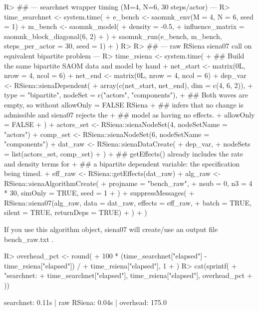 \documentclass[
  article]{jss}
\begin{document}
\begin{CodeChunk}
\begin{CodeInput}
R> ## --- searchnet wrapper timing (M=4, N=6, 30 steps/actor) ---
R> time_searchnet <- system.time({
+   e_bench <- saomnk_env(M = 4, N = 6, seed = 1)
+   m_bench <- saomnk_model(
+     density = -0.5,
+     influence_matrix = saomnk_block_diagonal(6, 2)
+   )
+   saomnk_run(e_bench, m_bench, steps_per_actor = 30, seed = 1)
+ })
R> 
R> ## --- raw RSiena siena07 call on equivalent bipartite problem ---
R> time_rsiena <- system.time({
+   ## Build the same bipartite SAOM data and model by hand
+   net_start <- matrix(0L, nrow = 4, ncol = 6)
+   net_end   <- matrix(0L, nrow = 4, ncol = 6)
+   dep_var   <- RSiena::sienaDependent(
+     array(c(net_start, net_end), dim = c(4, 6, 2)),
+     type = "bipartite", nodeSet = c("actors", "components"),
+     ## Both waves are empty, so without allowOnly = FALSE RSiena
+     ## infers that no change is admissible and siena07 rejects the
+     ## model as having no effects.
+     allowOnly = FALSE
+   )
+   actors_set <- RSiena::sienaNodeSet(4, nodeSetName = "actors")
+   comp_set   <- RSiena::sienaNodeSet(6, nodeSetName = "components")
+   dat_raw    <- RSiena::sienaDataCreate(
+     dep_var,
+     nodeSets = list(actors_set, comp_set)
+   )
+   ## getEffects() already includes the rate and density terms for
+   ## a bipartite dependent variable: the specification being timed.
+   eff_raw <- RSiena::getEffects(dat_raw)
+   alg_raw <- RSiena::sienaAlgorithmCreate(
+     projname = "bench_raw",
+     nsub = 0, n3 = 4 * 30, simOnly = TRUE, seed = 1
+   )
+   suppressMessages(
+     RSiena::siena07(alg_raw, data = dat_raw, effects = eff_raw,
+                     batch = TRUE, silent = TRUE, returnDeps = TRUE)
+   )
+ })
\end{CodeInput}
\begin{CodeOutput}
If you use this algorithm object, siena07 will create/use an output file bench_raw.txt .
\end{CodeOutput}
\begin{CodeInput}
R> overhead_pct <- round(
+   100 * (time_searchnet["elapsed"] - time_rsiena["elapsed"]) /
+     time_rsiena["elapsed"], 1
+ )
R> cat(sprintf(
+   "searchnet: %
+   time_searchnet["elapsed"], time_rsiena["elapsed"], overhead_pct
+ ))
\end{CodeInput}
\begin{CodeOutput}
searchnet: 0.11s | raw RSiena: 0.04s | overhead: 175.0%
\end{CodeOutput}
\end{CodeChunk}
\end{document}
